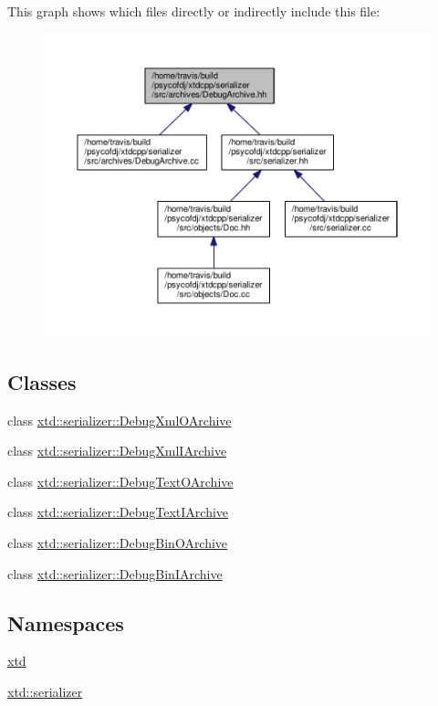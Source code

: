 This graph shows which files directly or indirectly include this file\-:
\nopagebreak
\begin{figure}[H]
\begin{center}
\leavevmode
\includegraphics[width=350pt]{DebugArchive_8hh__dep__incl}
\end{center}
\end{figure}
\subsection*{Classes}
\begin{DoxyCompactItemize}
\item 
class \hyperlink{classxtd_1_1serializer_1_1DebugXmlOArchive}{xtd\-::serializer\-::\-Debug\-Xml\-O\-Archive}
\item 
class \hyperlink{classxtd_1_1serializer_1_1DebugXmlIArchive}{xtd\-::serializer\-::\-Debug\-Xml\-I\-Archive}
\item 
class \hyperlink{classxtd_1_1serializer_1_1DebugTextOArchive}{xtd\-::serializer\-::\-Debug\-Text\-O\-Archive}
\item 
class \hyperlink{classxtd_1_1serializer_1_1DebugTextIArchive}{xtd\-::serializer\-::\-Debug\-Text\-I\-Archive}
\item 
class \hyperlink{classxtd_1_1serializer_1_1DebugBinOArchive}{xtd\-::serializer\-::\-Debug\-Bin\-O\-Archive}
\item 
class \hyperlink{classxtd_1_1serializer_1_1DebugBinIArchive}{xtd\-::serializer\-::\-Debug\-Bin\-I\-Archive}
\end{DoxyCompactItemize}
\subsection*{Namespaces}
\begin{DoxyCompactItemize}
\item 
\hyperlink{namespacextd}{xtd}
\item 
\hyperlink{namespacextd_1_1serializer}{xtd\-::serializer}
\end{DoxyCompactItemize}
